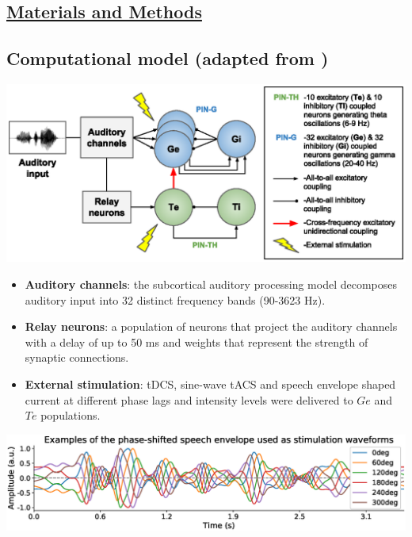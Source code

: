 \documentclass[a0,portrait]{a0poster}
\newenvironment{nitemize}{%
  \begin{itemize}[topsep=6pt,itemsep=2pt,parsep=0pt]%
}{%
  \end{itemize}%
}
\newenvironment{Figure}
  {\par\medskip\noindent\minipage{\linewidth}}
  {\endminipage\par\medskip}
\begin{document}
\begin{multicols*}{2}
\section*{\underline{Materials and Methods}}
\subsection*{Computational model \textnormal{(adapted from \cite{Hyafil2015a})}}
\begin{Figure}
\centering
\includegraphics[width=\linewidth,keepaspectratio]{Architecture.eps}
\end{Figure}
\begin{flushleft}
\normalsize
\begin{nitemize}
\item \textbf{Auditory channels}: the subcortical auditory processing model \cite{Chi2005MultiresolutionSounds} decomposes auditory input into 32 distinct frequency bands (90-3623 Hz).
\item \textbf{Relay neurons}: a population of neurons that project the auditory channels with a delay of up to 50 ms and weights that represent the strength of synaptic connections.
\item \textbf{External stimulation}: tDCS, sine-wave tACS and speech envelope shaped current at different phase lags and intensity levels were delivered to $Ge$ and $Te$ populations.
\end{nitemize}
\begin{Figure}
\centering
\includegraphics[width=\linewidth,keepaspectratio]{Envelopes.eps}
\end{Figure}
\end{flushleft}


\end{multicols*}
\end{document}
